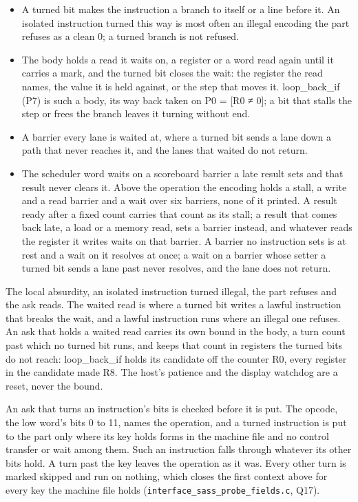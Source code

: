 \begin{itemize}
\item A turned bit makes the instruction a branch to itself or a line before it. An isolated instruction turned this way is most often an illegal encoding the part refuses as a clean 0; a turned branch is not refused.
\item The body holds a read it waits on, a register or a word read again until it carries a mark, and the turned bit closes the wait: the register the read names, the value it is held against, or the step that moves it. loop\_\allowbreak{}back\_\allowbreak{}if (P7) is such a body, its way back taken on P0 = [R0 ≠ 0]; a bit that stalls the step or frees the branch leaves it turning without end.
\item A barrier every lane is waited at, where a turned bit sends a lane down a path that never reaches it, and the lanes that waited do not return.
\item The scheduler word waits on a scoreboard barrier a late result sets and that result never clears it. Above the operation the encoding holds a stall, a write and a read barrier and a wait over six barriers, none of it printed. A result ready after a fixed count carries that count as its stall; a result that comes back late, a load or a memory read, sets a barrier instead, and whatever reads the register it writes waits on that barrier. A barrier no instruction sets is at rest and a wait on it resolves at once; a wait on a barrier whose setter a turned bit sends a lane past never resolves, and the lane does not return.
\end{itemize}

The local absurdity, an isolated instruction turned illegal, the part refuses and the ask reads. The waited read is where a turned bit writes a lawful instruction that breaks the wait, and a lawful instruction runs where an illegal one refuses. An ask that holds a waited read carries its own bound in the body, a turn count past which no turned bit runs, and keeps that count in registers the turned bits do not reach: loop\_\allowbreak{}back\_\allowbreak{}if holds its candidate off the counter R0, every register in the candidate made R8. The host's patience and the display watchdog are a reset, never the bound.

An ask that turns an instruction's bits is checked before it is put. The opcode, the low word's bits 0 to 11, names the operation, and a turned instruction is put to the part only where its key holds forms in the machine file and no control transfer or wait among them. Such an instruction falls through whatever its other bits hold. A turn past the key leaves the operation as it was. Every other turn is marked skipped and run on nothing, which closes the first context above for every key the machine file holds (\texttt{interface\_\allowbreak{}sass\_\allowbreak{}probe\_\allowbreak{}fields.\allowbreak{}c}, Q17).


